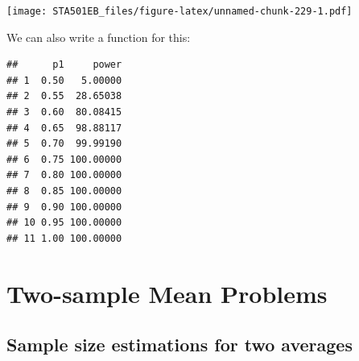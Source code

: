\documentclass[
]{book}
\newenvironment{Shaded}{\begin{snugshade}}{\end{snugshade}}
\newcommand{\AttributeTok}[1]{\textcolor[rgb]{0.13,0.29,0.53}{#1}}
\newcommand{\ControlFlowTok}[1]{\textcolor[rgb]{0.13,0.29,0.53}{\textbf{#1}}}
\newcommand{\DecValTok}[1]{\textcolor[rgb]{0.00,0.00,0.81}{#1}}
\newcommand{\FloatTok}[1]{\textcolor[rgb]{0.00,0.00,0.81}{#1}}
\newcommand{\FunctionTok}[1]{\textcolor[rgb]{0.13,0.29,0.53}{\textbf{#1}}}
\newcommand{\NormalTok}[1]{#1}
\newcommand{\OtherTok}[1]{\textcolor[rgb]{0.56,0.35,0.01}{#1}}
\newcommand{\SpecialCharTok}[1]{\textcolor[rgb]{0.81,0.36,0.00}{\textbf{#1}}}
\begin{document}
\texttt{[image: STA501EB\_files/figure-latex/unnamed-chunk-229-1.pdf]}

We can also write a function for this:

\begin{Shaded}
\end{Shaded}

\begin{verbatim}
##      p1     power
## 1  0.50   5.00000
## 2  0.55  28.65038
## 3  0.60  80.08415
## 4  0.65  98.88117
## 5  0.70  99.99190
## 6  0.75 100.00000
## 7  0.80 100.00000
## 8  0.85 100.00000
## 9  0.90 100.00000
## 10 0.95 100.00000
## 11 1.00 100.00000
\end{verbatim}

\hypertarget{two-sample-mean-problems}{%
\section{Two-sample Mean Problems}\label{two-sample-mean-problems}}

\hypertarget{sample-size-estimations-for-two-averages}{%
\subsection{\texorpdfstring{Sample size estimations for \textbf{two averages}}{Sample size estimations for two averages}}\label{sample-size-estimations-for-two-averages}}
\end{document}
